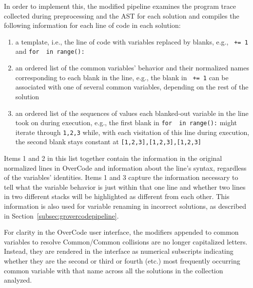 In order to implement this, the modified pipeline examines the program trace collected during preprocessing and the AST for each solution and compiles the following information for each line of code in each solution:
\begin{enumerate}
\item a template, i.e., the line of code with variables replaced by blanks, e.g., \texttt{\underline{\hspace{1em}} += 1} and \texttt{for \underline{\hspace{1em}} in range(\underline{\hspace{1em}}):}
\item an ordered list of the common variables' behavior and their normalized names corresponding to each blank in the line, e.g., the blank in \texttt{\underline{\hspace{1em}} += 1} can be associated with one of several common variables, depending on the rest of the solution
\item an ordered list of the sequences of values each blanked-out variable in the line took on during execution, e.g., the first blank in \texttt{for \underline{\hspace{1em}} in range(\underline{\hspace{1em}}):} might iterate through \texttt{1,2,3} while, with each visitation of this line during execution, the second blank stays constant at \texttt{[1,2,3],[1,2,3],[1,2,3]}
\end{enumerate}
Items 1 and 2 in this list together contain the information in the original normalized lines in OverCode and information about the line's syntax, regardless of the variables' identities. Items 1 and 3 capture the information necessary to tell what the variable behavior is just within that one line and whether two lines in two different stacks will be highlighted as different from each other. This information is also used for variable renaming in incorrect solutions, as described in Section~\ref{subsec:grovercodepipeline}.

For clarity in the OverCode user interface, the modifiers appended to common variables to resolve Common/Common collisions are no longer capitalized letters. Instead, they are rendered in the interface as numerical subscripts indicating whether they are the second or third or fourth (etc.) most frequently occurring common variable with that name across all the solutions in the collection analyzed.



